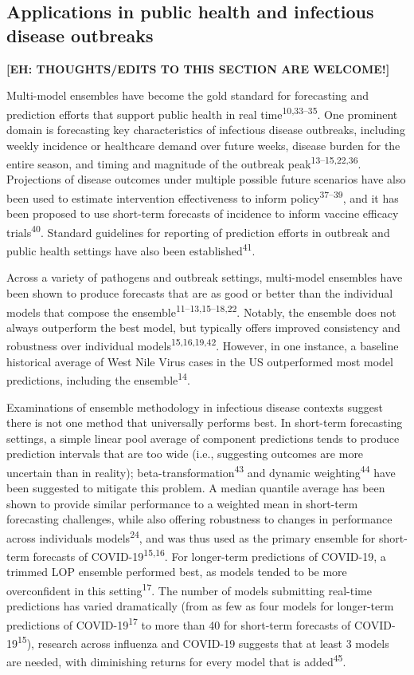 \documentclass[
  letterpaper,
  DIV=11,
  numbers=noendperiod]{scrartcl}
\begin{document}
\subsection{Applications in public health and infectious disease
outbreaks}\label{applications-in-public-health-and-infectious-disease-outbreaks}

\textbf{{[}EH: THOUGHTS/EDITS TO THIS SECTION ARE WELCOME!{]}}

Multi-model ensembles have become the gold standard for forecasting and
prediction efforts that support public health in real
time\textsuperscript{10,33--35}. One prominent domain is forecasting key
characteristics of infectious disease outbreaks, including weekly
incidence or healthcare demand over future weeks, disease burden for the
entire season, and timing and magnitude of the outbreak
peak\textsuperscript{13--15,22,36}. Projections of disease outcomes
under multiple possible future scenarios have also been used to estimate
intervention effectiveness to inform policy\textsuperscript{37--39}, and
it has been proposed to use short-term forecasts of incidence to inform
vaccine efficacy trials\textsuperscript{40}. Standard guidelines for
reporting of prediction efforts in outbreak and public health settings
have also been established\textsuperscript{41}.

Across a variety of pathogens and outbreak settings, multi-model
ensembles have been shown to produce forecasts that are as good or
better than the individual models that compose the
ensemble\textsuperscript{11--13,15--18,22}. Notably, the ensemble does
not always outperform the best model, but typically offers improved
consistency and robustness over individual
models\textsuperscript{15,16,19,42}. However, in one instance, a
baseline historical average of West Nile Virus cases in the US
outperformed most model predictions, including the
ensemble\textsuperscript{14}.

Examinations of ensemble methodology in infectious disease contexts
suggest there is not one method that universally performs best. In
short-term forecasting settings, a simple linear pool average of
component predictions tends to produce prediction intervals that are too
wide (i.e., suggesting outcomes are more uncertain than in reality);
beta-transformation\textsuperscript{43} and dynamic
weighting\textsuperscript{44} have been suggested to mitigate this
problem. A median quantile average has been shown to provide similar
performance to a weighted mean in short-term forecasting challenges,
while also offering robustness to changes in performance across
individuals models\textsuperscript{24}, and was thus used as the primary
ensemble for short-term forecasts of COVID-19\textsuperscript{15,16}.
For longer-term predictions of COVID-19, a trimmed LOP ensemble
performed best, as models tended to be more overconfident in this
setting\textsuperscript{17}. The number of models submitting real-time
predictions has varied dramatically (from as few as four models for
longer-term predictions of COVID-19\textsuperscript{17} to more than 40
for short-term forecasts of COVID-19\textsuperscript{15}), research
across influenza and COVID-19 suggests that at least 3 models are
needed, with diminishing returns for every model that is
added\textsuperscript{45}.
\end{document}
